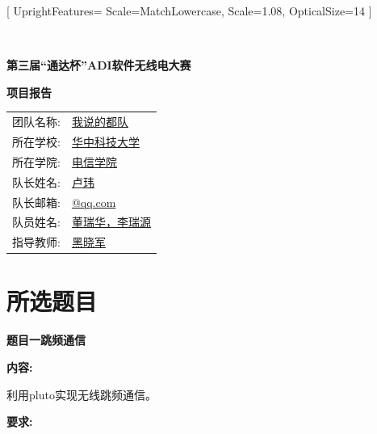 \documentclass[12pt]{ctexart}
\begin{document}
\setmainfont{Times New Roman}[
 	UprightFeatures= {
		Scale=MatchLowercase,
		Scale=1.08,
 		OpticalSize=14
 	}
]
\setlength{\baselineskip}{22pt}
\pagestyle{empty}


\ 

{
\vspace{50pt}
\centering\fontsize{24pt}{\baselineskip}\textbf{第三届“通达杯”ADI软件无线电大赛}

\vspace{30pt}
\centering\fontsize{36pt}{\baselineskip}\textbf{项目报告}

}

\vspace{170pt}
\begin{table}[htbp]
	\centering
	\fontsize{14pt}{\baselineskip}\songti
\begin{tabular}{ll}
	团队名称:\quad  &\underline{\qquad 我说的都队\hspace{1.97cm} } \bigskip \\
	所在学校:\quad  &\underline{\qquad 华中科技大学\hspace{1.48cm} } \bigskip \\
	所在学院:\quad  &\underline{\qquad 电信学院\hspace{2.462cm} } \bigskip \\
	队长姓名:\quad  &\underline{\qquad 卢玮\hspace{3.444cm} } \bigskip \\
	队长邮箱:\quad  &\underline{\qquad 2326521374@qq.com\hspace{0.375cm} } \bigskip \\
	队员姓名:\quad  &\underline{\qquad 董瑞华，李瑞源 \hspace{0.87cm} } \bigskip \\
	指导教师:\quad  &\underline{\qquad 黑晓军\hspace{2.953cm} } \bigskip \\
\end{tabular}
\end{table}
\newpage
\pagestyle{plain}



\section{所选题目}
\noindent \fontsize{14pt}{\baselineskip}\textbf{题目一\quad 跳频通信}

\noindent \textbf{内容:}

利用pluto实现无线跳频通信。

\bigskip
\noindent \textbf{要求:}
\end{document}
